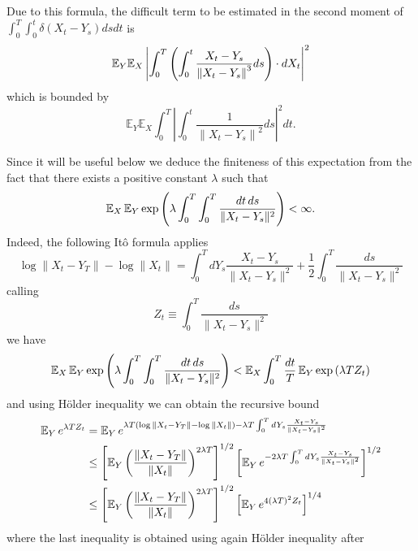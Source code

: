Due to this formula, the difficult term to
be estimated in the second moment of $\int_{0}^{T}  \int_{0}^{t}\delta
( X_{t}-Y_{s} ) ds  dt$ is
\begin{equation}
\mathbb{E}_{Y}\mathbb{E}_{X}\left| \int_{0}^{T}\left( \int_{0}^{t}\frac{%
X_{t}-Y_{s}}{\left\| X_{t}-Y_{s}\right\| ^{3}}ds\right) \cdot dX_{t}\right| ^{2}
\label{eq:moments_xx}
\end{equation}
which is bounded by
\begin{equation*}
\mathbb{E}_{Y}\mathbb{E}_{X}\int_{0}^{T}\left| \int_{0}^{t}\frac{1}{\left\|
X_{t}-Y_{s}\right\| ^{2}}ds\right| ^{2}dt.
\end{equation*}

Since it will be useful below we deduce the finiteness of this expectation
from the fact that there exists a
positive constant $\lambda$ such that
\begin{equation}
\operatorname{{\mathbb E}}_X \operatorname{{\mathbb E}}_Y \exp\left(\lambda \int_0^T \int_0^T \frac{dt\, ds}{\|X_t -
    Y_s\|^2} \right) < \infty.
\label{eq:finite_exp_lambda}
\end{equation}
Indeed, the following It\^o formula applies
$$
\log \|X_t - Y_T\| -  \log \|X_t\| = \int_0^T dY_s \frac{X_t -
  Y_s}{\|X_t - Y_s\|^2} + \frac{1}{2} \int_0^T \frac{ds}{\|X_t - Y_s\|^2} 
$$
calling 
$$
Z_t \equiv  \int_0^T \frac{ds}{\|X_t - Y_s\|^2}
$$
we have 
\begin{equation*}
\operatorname{{\mathbb E}}_X \operatorname{{\mathbb E}}_Y \exp\left(\lambda \int_0^T \int_0^T \frac{dt\, ds}{\|X_t -
    Y_s\|^2} \right) < 
\operatorname{{\mathbb E}}_X \int_0^T \frac{dt}{T}\operatorname{{\mathbb E}}_Y \exp\left(\lambda  T Z_t \right)
\end{equation*}
and using H\"older inequality  we can obtain the recursive bound
\begin{equation*}
\begin{split}
\operatorname{{\mathbb E}}_Y e^{\lambda T Z_t}
& = 
\operatorname{{\mathbb E}}_Y e^{ \lambda T (\log \|X_t - Y_T\| -  \log \|X_t\|) -\lambda T \int_0^T dY_s \frac{X_t -
  Y_s}{\|X_t - Y_s\|^2}}
\\ & \le \left[ \operatorname{{\mathbb E}}_Y \left(\frac{ \|X_t - Y_T\|}{ \|X_t\|}\right)^{2\lambda T}\right]^{1/2} 
\left[\operatorname{{\mathbb E}}_Y e^{  -2\lambda T \int_0^T dY_s \frac{X_t -
  Y_s}{\|X_t - Y_s\|^2}}\right]^{1/2}
\\ & \le \left[ \operatorname{{\mathbb E}}_Y \left(\frac{ \|X_t - Y_T\|}{ \|X_t
 \|}\right)^{2\lambda T}\right]^{1/2} 
\left[\operatorname{{\mathbb E}}_Y e^{  4(\lambda T)^2 Z_t }\right]^{1/4}
\end{split}
\end{equation*}
where the last inequality is obtained using again H\"older inequality after
